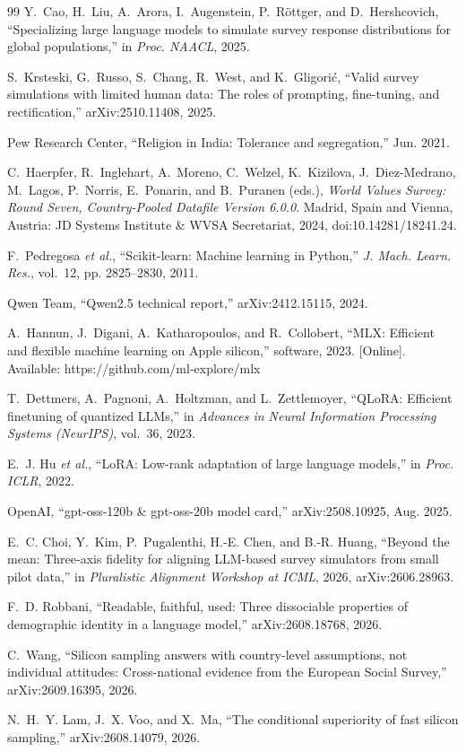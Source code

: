 \documentclass[conference]{IEEEtran}
\begin{document}
\begin{thebibliography}{99}
Y.~Cao, H.~Liu, A.~Arora, I.~Augenstein, P.~R\"{o}ttger, and D.~Hershcovich, ``Specializing large language models to simulate survey response distributions for global populations,'' in \emph{Proc. NAACL}, 2025.

S.~Krsteski, G.~Russo, S.~Chang, R.~West, and K.~Gligori\'{c}, ``Valid survey simulations with limited human data: The roles of prompting, fine-tuning, and rectification,'' arXiv:2510.11408, 2025.

Pew Research Center, ``Religion in India: Tolerance and segregation,'' Jun. 2021.

C.~Haerpfer, R.~Inglehart, A.~Moreno, C.~Welzel, K.~Kizilova, J.~Diez-Medrano, M.~Lagos, P.~Norris, E.~Ponarin, and B.~Puranen (eds.), \emph{World Values Survey: Round Seven, Country-Pooled Datafile Version 6.0.0}. Madrid, Spain and Vienna, Austria: JD Systems Institute \& WVSA Secretariat, 2024, doi:10.14281/18241.24.

F.~Pedregosa \emph{et al.}, ``Scikit-learn: Machine learning in Python,'' \emph{J. Mach. Learn. Res.}, vol.~12, pp. 2825--2830, 2011.

Qwen Team, ``Qwen2.5 technical report,'' arXiv:2412.15115, 2024.

A.~Hannun, J.~Digani, A.~Katharopoulos, and R.~Collobert, ``MLX: Efficient and flexible machine learning on Apple silicon,'' software, 2023. [Online]. Available: https://github.com/ml-explore/mlx

T.~Dettmers, A.~Pagnoni, A.~Holtzman, and L.~Zettlemoyer, ``QLoRA: Efficient finetuning of quantized LLMs,'' in \emph{Advances in Neural Information Processing Systems (NeurIPS)}, vol.~36, 2023.

E.~J. Hu \emph{et al.}, ``LoRA: Low-rank adaptation of large language models,'' in \emph{Proc. ICLR}, 2022.

OpenAI, ``gpt-oss-120b \& gpt-oss-20b model card,'' arXiv:2508.10925, Aug. 2025.

E.~C. Choi, Y.~Kim, P.~Pugalenthi, H.-E. Chen, and B.-R. Huang, ``Beyond the mean: Three-axis fidelity for aligning LLM-based survey simulators from small pilot data,'' in \emph{Pluralistic Alignment Workshop at ICML}, 2026, arXiv:2606.28963.

F.~D. Robbani, ``Readable, faithful, used: Three dissociable properties of demographic identity in a language model,'' arXiv:2608.18768, 2026.

C.~Wang, ``Silicon sampling answers with country-level assumptions, not individual attitudes: Cross-national evidence from the European Social Survey,'' arXiv:2609.16395, 2026.

N.~H.~Y. Lam, J.~X. Voo, and X.~Ma, ``The conditional superiority of fast silicon sampling,'' arXiv:2608.14079, 2026.

\end{thebibliography}
\end{document}
